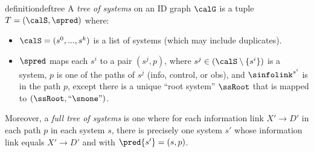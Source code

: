 






\begin{restatable}{definition}{deftree} \label{def:tree-of-systems}
A \emph{tree of systems} on an ID graph $\calG$ is a tuple $T=(\calS,\spred)$ where:
\begin{itemize}
    \item $\calS = (s^0,...,s^k)$ is a list of systems (which may include duplicates).
    
    \item $\spred$ maps each $s^i$ to a pair $(s^j,p)$, 
    where $s^j\in (\calS\setminus\{s^i\})$ is a system, %
    $p$ is one of the paths of $s^j$ (info, control, or obs), and
    $\sinfolink^{s^i}$ is in the path $p$,
    except there is a unique ``root system'' $\ssRoot$ that is mapped to $(\ssRoot,``\snone")$.
\end{itemize}
Moreover, a \emph{full tree of systems} is one where for each information link $X' \to D'$ in each path $p$ in each system $s$, there is precisely one system $s'$ whose information link equals $X' \to D'$ and with $\pred{s'}=(s,p)$.
\end{restatable}

